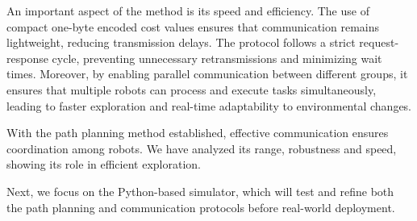 \documentclass[../main.tex]{subfiles}
\begin{document}
An important aspect of the method is its speed and efficiency. The use of compact one-byte encoded cost values ensures that communication remains lightweight, reducing transmission delays. The protocol follows a strict request-response cycle, preventing unnecessary retransmissions and minimizing wait times. Moreover, by enabling parallel communication between different groups, it ensures that multiple robots can process and execute tasks simultaneously, leading to faster exploration and real-time adaptability to environmental changes.

\vspace{2em}

With the path planning method established, effective communication ensures coordination among robots. We have analyzed its range, robustness and speed, showing its role in efficient exploration.  

\vspace{1em}

Next, we focus on the Python-based simulator, which will test and refine both the path planning and communication protocols before real-world deployment.
\end{document}
